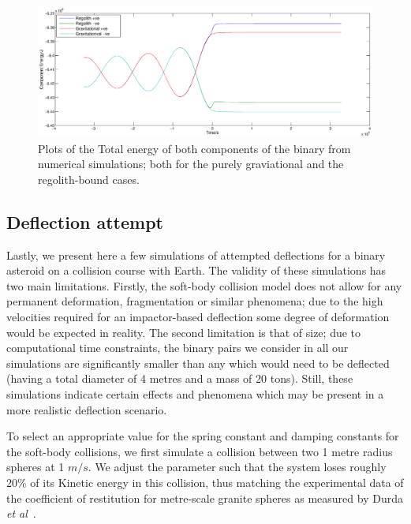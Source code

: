 \documentclass[letterpaper, preprint, paper,11pt]{AAS}	%
\begin{document}
\begin{figure}[H]
\centering
\centerline{\includegraphics[width=1.2\textwidth]{regolith_v_gravitational.eps}} 
\caption{Plots of the Total energy of both components of the binary from numerical simulations; both for the purely graviational and the regolith-bound cases.} 
\label{fig:reg}
\end{figure}

\subsection{Deflection attempt}
Lastly, we present here a few simulations of attempted deflections for a binary asteroid on a collision course with Earth. The validity of these simulations has two main limitations. Firstly, the soft-body collision model does not allow for any permanent deformation, fragmentation or similar phenomena; due to the high velocities required for an impactor-based deflection some degree of deformation would be expected in reality. The second limitation is that of size; due to computational time constraints, the binary pairs we consider in all our simulations are significantly smaller than any which would need to be deflected (having a total diameter of 4 metres and a mass of 20 tons). Still, these simulations indicate certain effects and phenomena which may be present in a more realistic deflection scenario. 

To select an appropriate value for the spring constant and damping constants for the soft-body collisions, we first simulate a collision between two 1 metre radius spheres at 1 $m/s$. We adjust the parameter such that the system loses roughly 20\% of its Kinetic energy in this collision, thus matching the experimental data of the coefficient of restitution for metre-scale granite spheres as measured by Durda \textit{et al}~\cite{bigrocks}.
\end{document}
